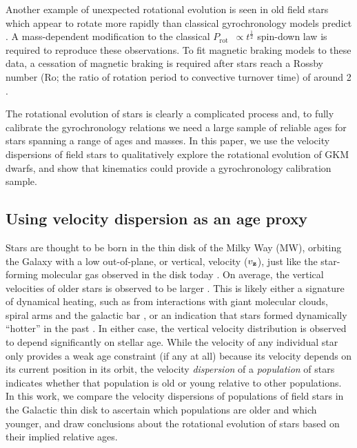 \documentclass{aastex63}
\newcommand{\eg}{{\it e.g.}}
\newcommand{\prot}{$P_{\mathrm{rot}}$}
\newcommand{\vz}{$v_{\bf z}$}
\newcommand{\racomment}[1]{{\color{blue}#1}}
\begin{document}
Another example of unexpected rotational evolution is seen in old field stars
which appear to rotate more rapidly than classical gyrochronology models
predict \citep{angus2015, vansaders2016, vansaders2018, metcalfe2019}.
A mass-dependent modification to the classical \prot\ $\propto
t^{\frac{1}{2}}$ spin-down law \citep{skumanich1972} is required to reproduce
these observations.
To fit magnetic braking models to these data, a cessation of magnetic braking
is required after stars reach a Rossby number (Ro; the ratio of rotation
period to convective turnover time) of around 2 \citep{vansaders2016,
vansaders2018}.

The rotational evolution of stars is clearly a complicated process and, to
fully calibrate the gyrochronology relations we need a large sample of
reliable ages for stars spanning a range of ages and masses.
In this paper, we use the velocity dispersions of field stars to qualitatively
explore the rotational evolution of GKM dwarfs, and show that kinematics could
provide a gyrochronology calibration sample.

\subsection{Using velocity dispersion as an age proxy}

Stars are thought to be born in the thin disk of the Milky Way (MW), orbiting
the Galaxy with a low out-of-plane, or vertical, velocity (\vz),
just like the star-forming molecular gas observed in the disk today
\citep[\eg][]{stark1989, stark2005, aumer2009, martig2014, aumer2016}.
On average, the vertical velocities of older stars is observed to be larger
\citep[\eg][]{nordstrom2004, holmberg2007, holmberg2009, aumer2009,
casagrande2011}.
This is likely either a signature of dynamical heating, such as from
interactions with giant molecular clouds, spiral arms and the galactic bar
\citep[see][for a review of secular evolution in the MW]{sellwood2014}, or an
indication that stars formed dynamically ``hotter'' in the past
\citep[e.g.,][]{bird2013}.
In either case, the vertical velocity distribution is observed to depend
significantly on stellar age.
While the velocity of any individual star only provides a weak age constraint
\racomment{(if any at all)} because its velocity depends on its current
position in its orbit, the velocity {\it dispersion} of a {\it population} of
stars indicates whether that population is old or young relative to other
populations.
In this work, we compare the velocity dispersions of populations of field
stars in the Galactic thin disk to ascertain which populations are older and
which younger, and draw conclusions about the rotational evolution of stars
based on their implied relative ages.
\end{document}
